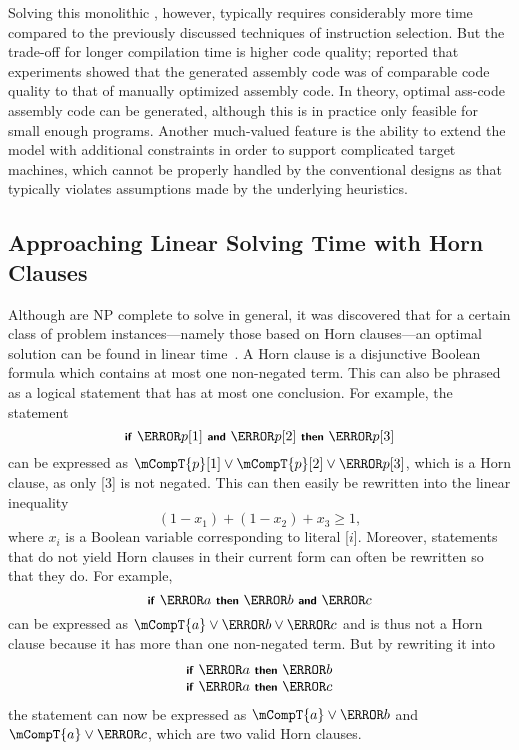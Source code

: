 Solving this monolithic \tIPmodel, however, typically requires considerably more
time compared to the previously discussed techniques of \gls{instruction
  selection}.
%
But the trade-off for longer compilation time is higher
code quality; \citeauthor{Wilson1994} reported that experiments showed that the
generated \gls{assembly code} was of comparable code quality to that of
manually optimized \gls{assembly code}.
%
In theory, \gls{optimal ass-code}
\gls{assembly code} can be generated, although this is in practice only feasible
for small enough \glspl{program}.
%
Another much-valued feature is the ability to
extend the model with additional constraints in order to support complicated
\glspl{target machine}, which cannot be properly handled by the conventional
designs as that typically violates assumptions made by the underlying
heuristics.


\subsection{Approaching Linear Solving Time with Horn Clauses}

\newcommand{\mCmd}[1]{\text{\smaller\sffamily\textbf{#1}}}

Although \tIPmodels are \gls{NP complete} to solve in general, it was discovered
that for a certain class of problem instances---namely those based on
\glspl{Horn clause}---an optimal solution can be found in linear
time~\cite{Hooker1988}.
%
A \gls{Horn clause} is a disjunctive Boolean formula
which contains at most one non-negated term.
%
This can also be phrased as a
logical statement that has at most one conclusion.
%
For example, the statement
\begin{displaymath}
  \mCmd{if}~\mT{p}[1]~\mCmd{and}~\mT{p}[2]~\mCmd{then}~\mT{p}[3]
\end{displaymath}
\noindent%
can be expressed as \mbox{$\mCompT{p}[1] \mOr \mCompT{p}[2] \mOr \mT{p}[3]$},
which is a \gls{Horn clause}, as only [3] is not negated.
%
This can then
easily be rewritten into the linear inequality
\begin{displaymath}
(1 - x_1) + (1 - x_2) + x_3 \ge 1,
\end{displaymath}
where $x_i$ is a Boolean variable corresponding to literal
[\larger$i$].
%
Moreover, statements that do not yield \glspl{Horn
  clause} in their current form can often be rewritten so that they do.
%
For
example,
\begin{displaymath}
  \mCmd{if}~\mT{a}~\mCmd{then}~\mT{b}~\mCmd{and}~\mT{c}
\end{displaymath}
\noindent%
can be expressed as \mbox{$\mCompT{a} \mOr \mT{b} \mOr \mT{c}$} and is thus not
a \gls{Horn clause} because it has more than one non-negated term.
%
But by
rewriting it into
\begin{displaymath}
  \begin{array}{c}
    \mCmd{if}~\mT{a}~\mCmd{then}~\mT{b}\\
    \mCmd{if}~\mT{a}~\mCmd{then}~\mT{c}
  \end{array}
\end{displaymath}
\noindent%
the statement can now be expressed as \mbox{$\mCompT{a} \mOr \mT{b}$} and
\mbox{$\mCompT{a} \mOr \mT{c}$}, which are two valid \glspl{Horn clause}.

